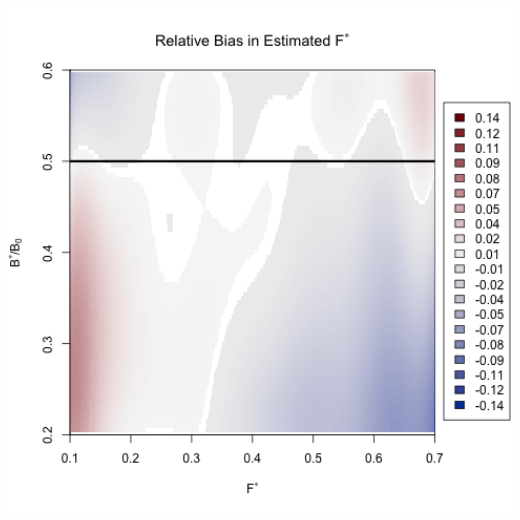 \documentclass[ xcolor = pdftex, dvipsnames, table ]{beamer}
\begin{document}
\begin{frame}
{\begin{minipage}[h!]{0.325\textwidth}
\end{minipage}
\begin{minipage}[h!]{0.325\textwidth}
\vspace*{-2.27cm}
\hspace*{-0.25cm}
\includegraphics[width=1.1\textwidth]{../../.././nick/gpBias/fMSYRelBiasPellaExpT45.png}\\
\end{minipage}
\begin{minipage}[h!]{0.325\textwidth}
\vspace*{-2.27cm}
\hspace*{0.25cm}

\end{minipage}}
\end{frame}
\end{document}
